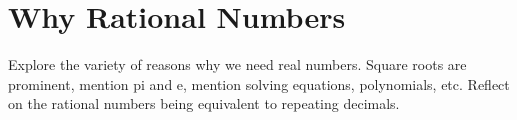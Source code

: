 \chapter{Why Rational Numbers}

Explore the variety of reasons why we need real numbers. Square roots are prominent, mention pi and e, mention solving equations, polynomials, etc. Reflect on the rational numbers being equivalent to repeating decimals. 

